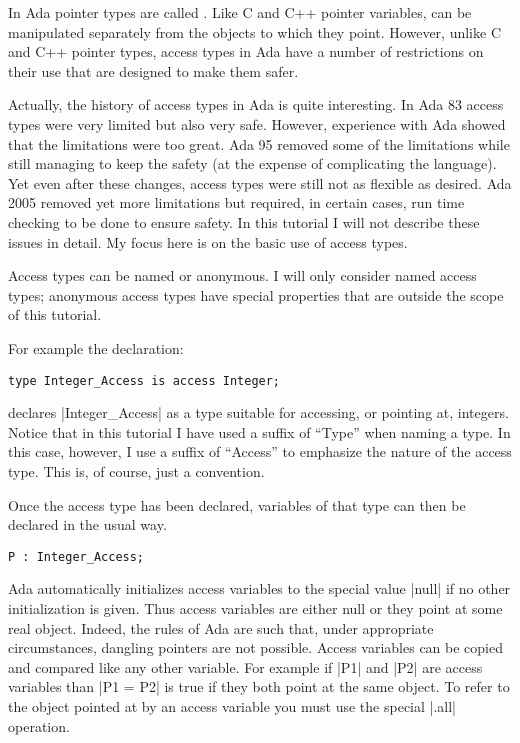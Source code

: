 In Ada pointer types are called . Like C and C++ pointer variables,
 can be manipulated separately from the objects to which they point.
However, unlike C and C++ pointer types, access types in Ada have a number of restrictions on
their use that are designed to make them safer.

Actually, the history of access types in Ada is quite interesting. In Ada 83 access types were
very limited but also very safe. However, experience with Ada showed that the limitations were
too great. Ada 95 removed some of the limitations while still managing to keep the safety (at
the expense of complicating the language). Yet even after these changes, access types were still
not as flexible as desired. Ada 2005 removed yet more limitations but required, in certain
cases, run time checking to be done to ensure safety. In this tutorial I will not describe these
issues in detail. My focus here is on the basic use of access types.

Access types can be named or anonymous. I will only consider named access types; anonymous
access types have special properties that are outside the scope of this tutorial.

For example the declaration:

\begin{lstlisting}
type Integer_Access is access Integer;
\end{lstlisting}

\noindent declares |Integer_Access| as a type suitable for accessing, or pointing at, integers.
Notice that in this tutorial I have used a suffix of ``Type'' when naming a type. In this case,
however, I use a suffix of ``Access'' to emphasize the nature of the access type. This is, of
course, just a convention.

Once the access type has been declared, variables of that type can then be declared in the usual
way.

\begin{lstlisting}
P : Integer_Access;
\end{lstlisting}

Ada automatically initializes access variables to the special value |null| if no other
initialization is given. Thus access variables are either null or they point at some real
object. Indeed, the rules of Ada are such that, under appropriate circumstances, dangling
pointers are not possible. Access variables can be copied and compared like any other variable.
For example if |P1| and |P2| are access variables than |P1 = P2| is true if they both point at
the same object. To refer to the object pointed at by an access variable you must use the
special |.all| operation.

